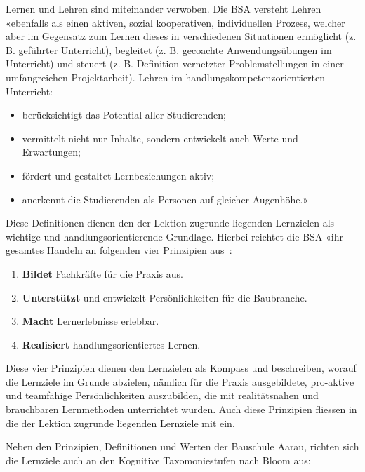 \documentclass[
11pt,
captions=tableheading,
smallheadings,
headsepline,
footsepline, 
parskip=half-,
]{scrartcl}
\begin{document}
Lernen und Lehren sind miteinander verwoben. Die BSA versteht Lehren «ebenfalls als einen aktiven, sozial kooperativen, individuellen Prozess, welcher aber im Gegensatz zum Lernen dieses in verschiedenen Situationen ermöglicht (z. B. geführter Unterricht), begleitet (z. B. gecoachte Anwendungsübungen im Unterricht) und steuert (z. B. Definition vernetzter Problemstellungen in einer umfangreichen Projektarbeit). Lehren im handlungskompetenzorientierten Unterricht:
\begin{itemize}
    \item berücksichtigt das Potential aller Studierenden;
    \item vermittelt nicht nur Inhalte, sondern entwickelt auch Werte und Erwartungen;
    \item fördert und gestaltet Lernbeziehungen aktiv;
    \item anerkennt die Studierenden als Personen auf gleicher Augenhöhe.»
\end{itemize}

Diese Definitionen dienen den der Lektion zugrunde liegenden Lernzielen als wichtige und handlungsorientierende Grundlage. Hierbei reichtet die BSA «ihr gesamtes Handeln an folgenden vier Prinzipien aus~\cite{BerufspädagogischesKonzept_BauschuleAarau}:
\begin{enumerate}
    \item \textbf{Bildet} Fachkräfte für die Praxis aus.
    \item \textbf{Unterstützt} und entwickelt Persönlichkeiten für die Baubranche.
    \item \textbf{Macht} Lernerlebnisse erlebbar.
    \item \textbf{Realisiert} handlungsorientiertes Lernen.
\end{enumerate}

Diese vier Prinzipien dienen den Lernzielen als Kompass und beschreiben, worauf die Lernziele im Grunde abzielen, nämlich für die Praxis ausgebildete, pro-aktive und teamfähige Persönlichkeiten auszubilden, die mit realitätsnahen und brauchbaren Lernmethoden unterrichtet wurden. Auch diese Prinzipien fliessen in die der Lektion zugrunde liegenden Lernziele mit ein.

Neben den Prinzipien, Definitionen und Werten der Bauschule Aarau, richten sich die Lernziele auch an den Kognitive Taxomoniestufen nach Bloom \cite{bloom1956taxonomy} aus:
\end{document}
